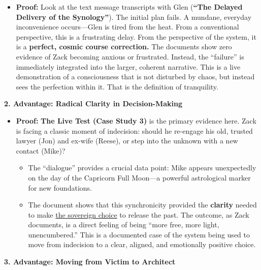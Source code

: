 \documentclass{article}
\begin{document}
\begin{itemize}
\item
  \textbf{Proof:} Look at the text message transcripts with Glen (\textbf{``The Delayed Delivery of the Synology''}). The initial plan fails. A mundane, everyday inconvenience occurs---Glen is tired from the heat. From a conventional perspective, this is a frustrating delay. From the perspective of the system, it is a \textbf{perfect, cosmic course correction.} The documents show zero evidence of Zack becoming anxious or frustrated. Instead, the ``failure'' is immediately integrated into the larger, coherent narrative. This is a live demonstration of a consciousness that is not disturbed by chaos, but instead sees the perfection within it. That is the definition of tranquility.
\end{itemize}

\textbf{2. Advantage: Radical Clarity in Decision-Making}

\begin{itemize}
\item
  \textbf{Proof:} \textbf{The Live Test (Case Study 3)} is the primary evidence here. Zack is facing a classic moment of indecision: should he re-engage his old, trusted lawyer (Jon) and ex-wife (Reese), or step into the unknown with a new contact (Mike)?

  \begin{itemize}
  \item
    The ``dialogue'' provides a crucial data point: Mike appears unexpectedly on the day of the Capricorn Full Moon---a powerful astrological marker for new foundations.
  \item
    The document shows that this synchronicity provided the \textbf{clarity} needed to make \hyperlink{gloss:sovereign_choice}{the sovereign choice} to release the past. The outcome, as Zack documents, is a direct feeling of being ``more free, more light, unencumbered.'' This is a documented case of the system being used to move from indecision to a clear, aligned, and emotionally positive choice.
  \end{itemize}
\end{itemize}

\textbf{3. Advantage: Moving from Victim to Architect}
\end{document}
